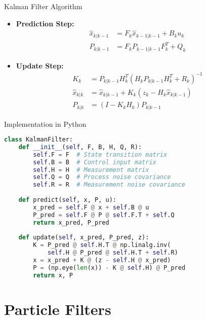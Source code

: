\documentclass[aspectratio=169]{beamer}
\begin{document}
\begin{frame}{Kalman Filter Algorithm}
    \begin{itemize}
        \item<1-> \textbf{Prediction Step:}
            \begin{align*}
                \hat{x}_{k|k-1} &= F_k\hat{x}_{k-1|k-1} + B_ku_k \\
                P_{k|k-1} &= F_kP_{k-1|k-1}F_k^T + Q_k
            \end{align*}
        \item<2-> \textbf{Update Step:}
            \begin{align*}
                K_k &= P_{k|k-1}H_k^T(H_kP_{k|k-1}H_k^T + R_k)^{-1} \\
                \hat{x}_{k|k} &= \hat{x}_{k|k-1} + K_k(z_k - H_k\hat{x}_{k|k-1}) \\
                P_{k|k} &= (I - K_kH_k)P_{k|k-1}
            \end{align*}
    \end{itemize}
\end{frame}

\begin{frame}{Implementation in Python}
    \begin{lstlisting}[language=Python]
class KalmanFilter:
    def __init__(self, F, B, H, Q, R):
        self.F = F  # State transition matrix
        self.B = B  # Control input matrix
        self.H = H  # Measurement matrix
        self.Q = Q  # Process noise covariance
        self.R = R  # Measurement noise covariance
        
    def predict(self, x, P, u):
        x_pred = self.F @ x + self.B @ u
        P_pred = self.F @ P @ self.F.T + self.Q
        return x_pred, P_pred
        
    def update(self, x_pred, P_pred, z):
        K = P_pred @ self.H.T @ np.linalg.inv(
            self.H @ P_pred @ self.H.T + self.R)
        x = x_pred + K @ (z - self.H @ x_pred)
        P = (np.eye(len(x)) - K @ self.H) @ P_pred
        return x, P
    \end{lstlisting}
\end{frame}

\section{Particle Filters}
\end{document}
